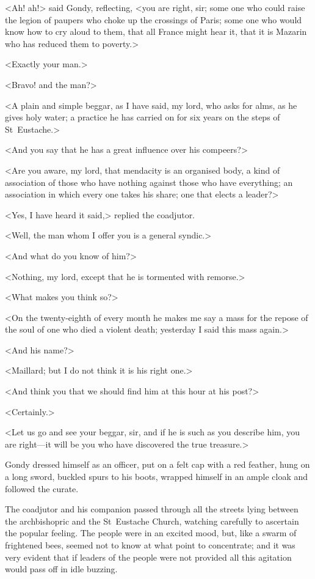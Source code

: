 <Ah! ah!> said Gondy, reflecting, <you are right, sir; some one who could raise the legion of paupers who choke up the crossings of Paris; some one who would know how to cry aloud to them, that all France might hear it, that it is Mazarin who has reduced them to poverty.>

<Exactly your man.>

<Bravo! and the man?>

<A plain and simple beggar, as I have said, my lord, who asks for alms, as he gives holy water; a practice he has carried on for six years on the steps of St~Eustache.>

<And you say that he has a great influence over his compeers?>

<Are you aware, my lord, that mendacity is an organised body, a kind of association of those who have nothing against those who have everything; an association in which every one takes his share; one that elects a leader?>

<Yes, I have heard it said,> replied the coadjutor.

<Well, the man whom I offer you is a general syndic.>

<And what do you know of him?>

<Nothing, my lord, except that he is tormented with remorse.>

<What makes you think so?>

<On the twenty-eighth of every month he makes me say a mass for the repose of the soul of one who died a violent death; yesterday I said this mass again.>

<And his name?>

<Maillard; but I do not think it is his right one.>

<And think you that we should find him at this hour at his post?>

<Certainly.>

<Let us go and see your beggar, sir, and if he is such as you describe him, you are right—it will be you who have discovered the true treasure.>

Gondy dressed himself as an officer, put on a felt cap with a red feather, hung on a long sword, buckled spurs to his boots, wrapped himself in an ample cloak and followed the curate.

The coadjutor and his companion passed through all the streets lying between the archbishopric and the St~Eustache Church, watching carefully to ascertain the popular feeling. The people were in an excited mood, but, like a swarm of frightened bees, seemed not to know at what point to concentrate; and it was very evident that if leaders of the people were not provided all this agitation would pass off in idle buzzing.

